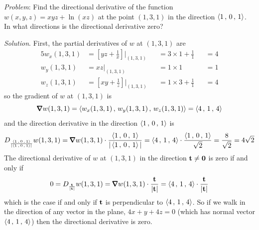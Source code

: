 \begin{eg}\label{eg dir deriv B}
\noindent\textit{Problem}:
Find the directional derivative of the function $w(x,y,z)=xyz +\ln(xz)$
at the point $(1,3,1)$ in the direction $\left< 1\,,\,0\,,\,1\right>$. 
In what directions is the directional derivative zero?

\medskip
\noindent\textit{Solution}. 
First, the partial derivatives of $w$ at $(1,3,1)$ are
\begin{alignat*}{5}
w_x(1,3,1) &= \left[yz+\frac{1}{x}\right]\bigg|_{(1,3,1)} 
             &&=3\times 1+\frac{1}{1}&&=4 \\
w_y(1,3,1) &= xz\bigg|_{(1,3,1)} &&=1\times 1&&=1 \\
w_z(1,3,1) &= \left[xy+\frac{1}{z}\right]\bigg|_{(1,3,1)} &&=1\times 3 +\frac{1}{1} &&=4
\end{alignat*}
so the gradient of $w$ at $(1,3,1)$ is
\begin{equation*}
\vnabla w(1,3,1) = \llt w_x(1,3,1)\,,\,w_y(1,3,1)\,,\,w_z(1,3,1)\rgt
               = \llt 4\,,\,1\,,\,4\rgt
\end{equation*}
and the direction derivative in the direction $\left< 1\,,\,0\,,\,1\right>$ is
\begin{equation*}
D_{\frac{\llt 1\,,\,0\,,\,1\rgt}{|\llt 1\,,\,0\,,\,1\rgt|}} w(1,3,1) 
   = \vnabla w(1,3,1)\cdot
              \frac{\llt 1\,,\,0\,,\,1\rgt}{|\llt 1\,,\,0\,,\,1\rgt|}
   = \llt 4\,,\,1\,,\,4\rgt\cdot \frac{\llt 1\,,\,0\,,\,1\rgt}{\sqrt{2}}
   = \frac{8}{\sqrt{2}}=4\sqrt{2}
\end{equation*}
The directional derivative of $w$ at $(1,3,1)$ in the direction $\mathbf{t}\ne\mathbf{0}$
is zero if and only if
\begin{equation*}
0 = D_{\frac{\vt}{|\vt|}} w(1,3,1) 
   = \vnabla w(1,3,1)\cdot\frac{\vt}{|\vt|}
   = \llt 4\,,\,1\,,\,4\rgt\cdot \frac{\vt}{|\vt|}
\end{equation*}
which is the case if and only if $\mathbf{t}$ is perpendicular to
$\left< 4\,,\,1\,,\,4\right>$. So if we walk in the direction of any vector
in the plane, $4x+y+4z=0$ (which has normal vector $\left< 4\,,\,1\,,\,4\right>$)
then the directional derivative is zero.


\end{eg}

